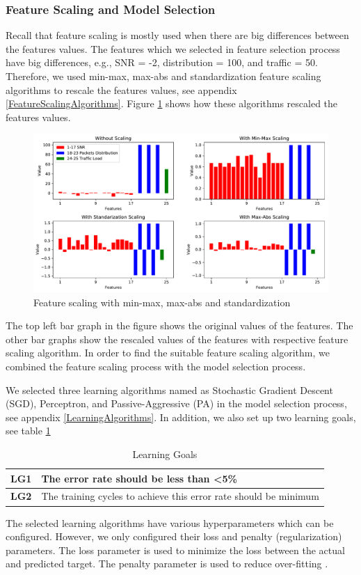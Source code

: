 \documentclass[a4paper,12pt]{article}
\begin{document}
\subsubsection{Feature Scaling and Model Selection}
Recall that feature scaling is mostly used when there are big differences between the features values. The features which we selected in feature selection process have big differences, e.g., SNR = -2, distribution = 100, and traffic = 50. Therefore, we used min-max, max-abs and standardization feature scaling algorithms to rescale the features values, see appendix \ref{FeatureScalingAlgorithms}. Figure \ref{FeatureScaling} shows how these algorithms rescaled the features values.
\begin{figure}[H]
    \centering
    \includegraphics[keepaspectratio, width=\linewidth]{graphs/FeatureScaling.pdf}
    \caption{Feature scaling with min-max, max-abs and standardization}
    \label{FeatureScaling}
\end{figure}
The top left bar graph in the figure shows the original values of the features. The other bar graphs show the rescaled values of the features with respective feature scaling algorithm. In order to find the suitable feature scaling algorithm, we combined the feature scaling process with the model selection process.

We selected three learning algorithms named as Stochastic Gradient Descent (SGD), Perceptron, and Passive-Aggressive (PA) in the model selection process, see appendix \ref{LearningAlgorithms}. In addition, we also set up two learning goals, see table \ref{LearningGoals}
\begin{table}[H]
	\centering
	\begin{tabular}{|p{1cm}|p{11cm}|}
		\hline
		\textbf{LG1} & The error rate should be less than <5\% \\
		\hline
		\textbf{LG2} & The training cycles to achieve this error rate should be minimum \\
		\hline
	\end{tabular}
	\caption{Learning Goals}
	\label{LearningGoals}
\end{table}
The selected learning algorithms have various hyperparameters which can be configured. However, we only configured their loss and penalty (regularization) parameters. The loss parameter is used to minimize the loss between the actual and predicted target. The penalty parameter is used to reduce over-fitting \cite{MMLWSL-2014}.
\end{document}
